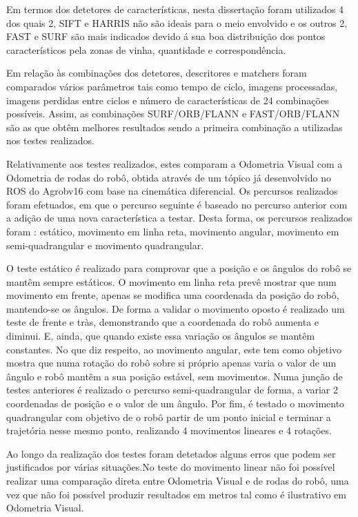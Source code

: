 Em termos dos detetores de características, nesta dissertação foram utilizados 4 dos quais 2, SIFT e HARRIS não são ideais para o meio envolvido e os outros 2, FAST e SURF são mais indicados devido á sua boa distribuição dos pontos característicos pela zonas de vinha, quantidade e correspondência.

Em relação às combinações dos detetores, descritores e matchers foram comparados vários parâmetros tais como tempo de ciclo, imagens processadas, imagens perdidas entre ciclos e número de características de 24 combinações possíveis. Assim, as combinações SURF/ORB/FLANN e FAST/ORB/FLANN são as que obtêm melhores resultados sendo a primeira combinação a utilizadas nos testes realizados.

Relativamente aos testes realizados, estes comparam a Odometria Visual com a Odometria de rodas do robô, obtida através de um tópico já desenvolvido no ROS do Agrobv16 com base na cinemática diferencial. Os percursos realizados foram efetuados, em que o percurso seguinte é baseado no percurso anterior com a adição de uma nova característica a testar. Desta forma, os percursos realizados foram : estático, movimento em linha reta, movimento angular, movimento em semi-quadrangular e movimento quadrangular.


O teste estático é realizado para comprovar que a posição e os ângulos do robô se mantêm sempre estáticos. O movimento em linha reta prevê mostrar que num movimento em frente, apenas se modifica uma coordenada da posição do robô, mantendo-se os ângulos. De forma a validar o movimento oposto é realizado um teste de frente e tràs, demonstrando que a coordenada do robô aumenta e diminui. E, ainda,  que quando existe essa variação os ângulos se mantêm constantes. No que diz respeito, ao movimento angular, este tem como objetivo mostra que numa rotação do robô sobre si próprio apenas varia o valor de um ângulo e robô mantêm a sua posição estável, sem movimentos. Numa junção de testes anteriores é realizado o percurso semi-quadrangular de forma, a variar 2 coordenadas de posição e o valor de um ângulo. Por fim, é testado o movimento quadrangular com objetivo de o robô partir de um ponto inicial e terminar a trajetória nesse mesmo ponto, realizando 4 movimentos lineares e 4 rotações.

 
Ao longo da realização dos testes foram detetados alguns erros que podem ser justificados por várias situações.No teste do movimento linear não foi possível realizar uma comparação direta entre Odometria Visual e de rodas do robô, uma vez que não foi possível produzir resultados em metros tal como é ilustrativo em Odometria Visual.


